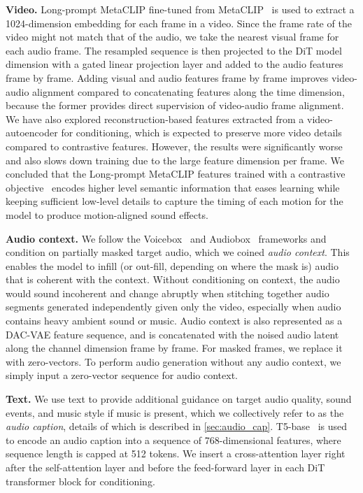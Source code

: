 \textbf{Video.}
Long-prompt MetaCLIP fine-tuned from MetaCLIP~\citep{xu2023demystifying} is used to extract a 1024-dimension embedding for each frame in a video.
Since the frame rate of the video might not match that of the audio, we take the nearest visual frame for each audio frame.
The resampled sequence is then projected to the DiT model dimension with a gated linear projection layer and added to the audio features frame by frame.
Adding visual and audio features frame by frame improves video-audio alignment compared to concatenating features along the time dimension,
because the former provides direct supervision of video-audio frame alignment.
We have also explored reconstruction-based features extracted from a video-autoencoder for conditioning,
which is expected to preserve more video details compared to contrastive features.
However, the results were significantly worse and also slows down training due to the large feature dimension per frame.
We concluded that the Long-prompt MetaCLIP features trained with a contrastive objective~\citep{oord2018representation, radford2021learning} encodes higher level semantic information that eases learning while keeping sufficient low-level details to capture the timing of each motion for the model to produce motion-aligned sound effects.

\textbf{Audio context.}
We follow the Voicebox~\citep{le2023voicebox} and Audiobox~\citep{vyas2023audiobox} frameworks and condition on partially masked target audio, which we coined \textit{audio context}.
This enables the model to infill (or out-fill, depending on where the mask is) audio that is coherent with the context.
Without conditioning on context, the audio would sound incoherent and change abruptly when stitching together audio segments generated independently given only the video, especially when audio contains heavy ambient sound or music.
Audio context is also represented as a DAC-VAE feature sequence, and is concatenated with the noised audio latent along the channel dimension frame by frame.
For masked frames, we replace it with zero-vectors.
To perform audio generation without any audio context, we simply input a zero-vector sequence for audio context.

\textbf{Text.}
We use text to provide additional guidance on target audio quality, sound events, and music style if music is present, which we collectively refer to as the \textit{audio caption}, details of which is described in \cref{sec:audio_cap}.
T5-base~\citep{raffel2020exploring} is used to encode an audio caption into a sequence of 768-dimensional features, where sequence length is capped at 512 tokens.
We insert a cross-attention layer right after the self-attention layer and before the feed-forward layer in each DiT transformer block for conditioning.\\

